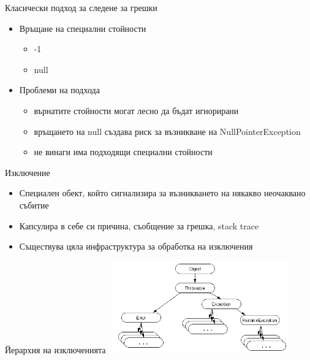 \documentclass{beamer}
\begin{document}
\begin{frame}{Класически подход за следене за грешки}
  \transdissolve
  \begin{itemize}
  \item Връщане на специални стойности \pause
    \begin{itemize}
      \item -1 \pause
      \item null \pause
    \end{itemize}
  \item Проблеми на подхода \pause
    \begin{itemize}
      \item върнатите стойности могат лесно да бъдат игнорирани \pause
      \item връщането на null създава риск за възникване на
        NullPointerException \pause
      \item не винаги има подходящи специални стойности
    \end{itemize}

  \end{itemize}
\end{frame}

\begin{frame}{Изключение}
  \transdissolve
  \begin{itemize}
  \item Специален обект, който сигнализира за възникването на някакво
    неочаквано събитие \pause
  \item Капсулира в себе си причина, съобщение за грешка, stack trace \pause
  \item Съществува цяла инфраструктура за обработка на изключения
  \end{itemize}
\end{frame}


\begin{frame}{Йерархия на изключенията}
  \transdissolve
  \includegraphics[height=150px,width=300px]{images/throwableHierarchy}
\end{frame}
\end{document}

